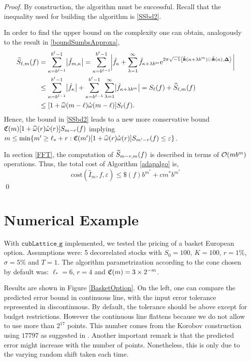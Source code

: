\documentclass[graybox]{svmult}
\newcommand{\bsDelta}{\boldsymbol{\Delta}}    %
\begin{document}
\begin{proof}
By construction, the algorithm must be successful. Recall that the inequality used for building the algorithm is \eqref{SSbd2}.

In order to find the upper bound on the complexity one can obtain, analogously to the result in \eqref{boundSumbsApproxa},
\begin{align}
\nonumber
\tS_{\ell,m}(f) &= \sum_{\kappa=b^{\ell-1}}^{b^{\ell}-1} \bigabs{ \tf_{m,\kappa}} = \sum_{\kappa=b^{\ell-1}}^{b^{\ell}-1} \biggabs{\hf_{\kappa} + \sum_{\lambda=1}^{\infty} \hf_{\kappa+\lambda b^{m}} \E^{2 \pi \sqrt{-1} \ip{\tvk(\kappa+\lambda b^{m}) \ominus \tvk(\kappa)}{\bsDelta}}}\\
\nonumber
&\le \sum_{\kappa=b^{\ell-1}}^{b^{\ell}-1} \bigabs{\hf_{\kappa}} + \sum_{\kappa=b^{\ell-1}}^{b^{\ell}-1} \sum_{\lambda=1}^{\infty} \bigabs{\hf_{\kappa+\lambda b^{m}}} 
= S_{\ell}(f) + \hS_{\ell,m}(f) \\
\nonumber
&\le [1  + \homega(m-\ell) \wcomega(m-\ell)] S_\ell(f). \label{SSbd3}
\end{align}
Hence, the bound in \eqref{SSbd2} leads to a new more conservative bound $\mathfrak{C}(m) [1  + \widehat{\omega}(r) \mathring{\omega}(r)] S_{m-r}(f)$ implying $
m \le {\min \{m' \ge \ell_*+r : \mathfrak{C}(m') [1+ \widehat{\omega}(r) \mathring{\omega}(r)] S_{m'-r}(f) \le \varepsilon \}}$.

In section \ref{FFT}, the computation of $\widetilde{S}_{m-r,m}(f)$ is described in terms of $\mathcal{O}(mb^m)$ operations. Thus, the total cost of Algorithm \ref{adapalgo} is,
\[
\mathrm{cost}\left(\widehat{I}_m,f,\varepsilon\right)\leq \$(f)b^{m^*}+cm^*b^{m^*}
\]
\hfill \qed
\end{proof}

\section{Numerical Example} \label{secnumexpsec}

With $\texttt{cubLattice\_g}$ implemented, we tested the pricing of a basket European option. Assumptions were: 5 decorrelated stocks with $S_0=100$, $K=100$, $r=1\%$, $\sigma=5\%$ and $T=1$. The algorithm parametrization according to the cone chosen by default was: $\ell_*=6$, $r=4$ and $\mathfrak{C}(m)=3 \times 2^{-m}$.

Results are shown in Figure \ref{BasketOption}. On the left, one can compare the predicted error bound in continuous line, with the input error tolerance represented in discontinuous. By default, the tolerance should be above except for budget restrictions. However the continuous line flattens because we do not allow to use more than $2^{17}$ points. This number comes from the Korobov construction using $17797$ as suggested in \cite{HicEtal00}. Another important remark is that the predicted error might increase with the number of points. Nonetheless, this is only due to the varying random shift taken each time.
\end{document}
